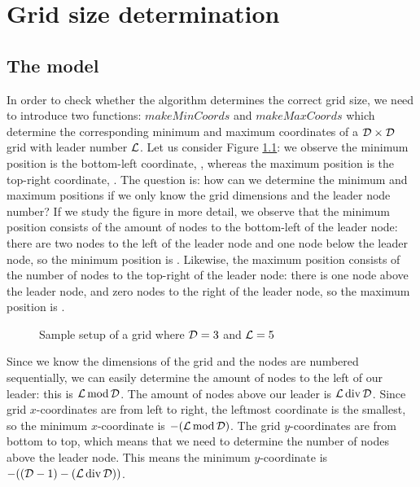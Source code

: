 \chapter{Grid size determination}

\section{The model}
\label{model:gridsize}

In order to check whether the algorithm determines the correct grid size, we need to introduce two functions: $makeMinCoords$ and $makeMaxCoords$ which determine the corresponding minimum and maximum coordinates of a $\mathcal{D} \times \mathcal{D}$ grid with leader number $\mathcal{L}$. Let us consider Figure \ref{fig:sizegrid}: we observe the minimum position is the bottom-left coordinate, , whereas the maximum position is the top-right coordinate, . The question is: how can we determine the minimum and maximum positions if we only know the grid dimensions and the leader node number? If we study the figure in more detail, we observe that the minimum position consists of the amount of nodes to the bottom-left of the leader node: there are two nodes to the left of the leader node and one node below the leader node, so the minimum position is . Likewise, the maximum position consists of the number of nodes to the top-right of the leader node: there is one node above the leader node, and zero nodes to the right of the leader node, so the maximum position is .


\begin{figure}[ht]
 \centering
 \caption{\label{fig:sizegrid} Sample setup of a grid where $\mathcal{D} = 3$ and $\mathcal{L} = 5$}
\end{figure}

Since we know the dimensions of the grid and the nodes are numbered sequentially, we can easily determine the amount of nodes to the left of our leader: this is $\mathcal{L} \operatorname{mod} \mathcal{D}$. The amount of nodes above our leader is $\mathcal{L} \operatorname{div} \mathcal{D}$. Since grid $x$-coordinates are from left to right, the leftmost coordinate is the smallest, so the minimum $x$-coordinate is $-(\mathcal{L} \operatorname{mod} \mathcal{D})$. The grid $y$-coordinates are from bottom to top, which means that we need to determine the number of nodes above the leader node. This means the minimum $y$-coordinate is $-((\mathcal{D}-1) - (\mathcal{L} \operatorname{div} \mathcal{D}))$.

